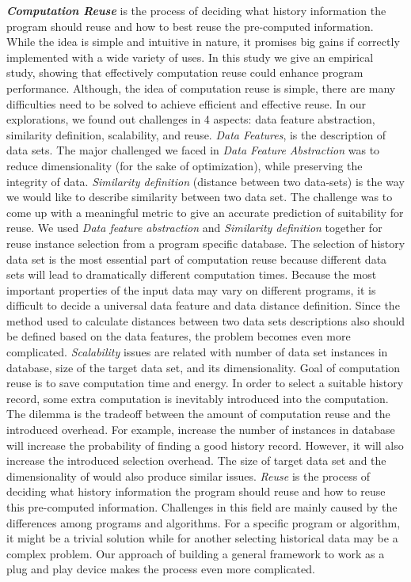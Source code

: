 \documentclass{vldb}
\begin{document}
\textbf{\textit{Computation Reuse}} is the process of deciding what history information the program should reuse and how to best reuse the pre-computed information.
While the idea is simple and intuitive in nature, it promises big gains if correctly implemented with a wide variety of uses.
In this study we give an empirical study, showing that effectively computation reuse could enhance program performance.
Although, the idea of computation reuse is simple, there are many difficulties need to be solved to achieve efficient and effective reuse. 
In our explorations, we found out challenges in 4 aspects: data feature abstraction, similarity definition, scalability, and reuse. 
\textit{Data Features}, is the description of data sets. The major challenged we faced in \textit{Data Feature Abstraction} was to reduce dimensionality (for the sake of optimization), while preserving the integrity of data.
\textit{Similarity definition} (distance between two data-sets) is the way we would like to describe similarity between two data set. The challenge was to come up with a meaningful metric to give an accurate prediction of suitability for reuse. 
We used \textit{Data feature abstraction} and \textit{Similarity definition} together for reuse instance selection from a program specific database. The selection of history data set is the most essential part of computation reuse because different data sets will lead to dramatically different computation times. Because the most important properties of the input data may vary on different programs, it is difficult to decide a universal data feature and data distance definition. Since the method used to calculate distances between two data sets descriptions also should be defined based on the data features, the problem becomes even more complicated. 
\textit{Scalability} issues are related with number of data set instances in database, size of the target data set, and its dimensionality. Goal of computation reuse is to save computation time and energy. In order to select a suitable history record, some extra computation is inevitably introduced into the computation. The dilemma is the tradeoff between the amount of computation reuse and the introduced overhead. For example, increase the number of instances in database will increase the probability of finding a good history record. However, it will also increase the introduced selection overhead. The size of target data set and the dimensionality of would also produce similar issues.
\textit{Reuse} is the process of deciding what history information the program should reuse and how to reuse this pre-computed information. Challenges in this field are mainly caused by the differences among programs and algorithms. For a specific program or algorithm, it might be a trivial solution while for another selecting historical data may be a complex problem. Our approach of building a general framework to work as a plug and play device makes the process even more complicated. 
\end{document}
